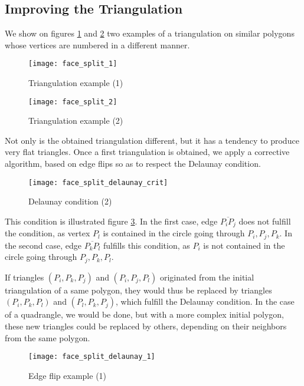 \subsection{Improving the Triangulation\label{sec:triangle_delaunay}}

We show on figures \ref{fig:algo.decoup_ex_1} and \ref{fig:algo.decoup_ex_2}
two examples of a triangulation on similar polygons whose vertices are
numbered in a different manner.

\begin{figure}[!h]
\centerline{
\texttt{[image: face\_split\_1]}}
\caption{Triangulation example (1)}
\label{fig:algo.decoup_ex_1}
\end{figure}

\begin{figure}[!h]
\centerline{
\texttt{[image: face\_split\_2]}}
\caption{Triangulation example (2)}
\label{fig:algo.decoup_ex_2}
\end{figure}

\vfill

Not only is the obtained triangulation different, but it has a tendency
to produce very flat triangles. Once a first triangulation is obtained,
we apply a corrective algorithm, based on edge flips so as to respect
the Delaunay condition.

\begin{figure}[!h]
\centerline{
\texttt{[image: face\_split\_delaunay\_crit]}}
\caption{Delaunay condition (2)}
\label{fig:algo.delaunay_cond}
\end{figure}

This condition is illustrated figure \ref{fig:algo.delaunay_cond}.
In the first case, edge $\overline{P_i P_j}$ does not fulfill the
condition, as vertex $P_l$ is contained in the circle going through
$P_i, P_j, P_k$. In the second case, edge $\overline{P_k P_l}$ fulfills
this condition, as $P_i$ is not contained in the circle going through
$P_j, P_k, P_l$.

If triangles $(P_i, P_k, P_j)$ and $(P_i, P_j, P_l)$ originated from
the initial triangulation of a same polygon, they would thus be replaced
by triangles $(P_i, P_k, P_l)$ and $(P_l, P_k, P_j)$, which
fulfill the Delaunay condition. In the case of a quadrangle, we
would be done, but with a more complex initial polygon,
these new triangles could be replaced by others, depending on their
neighbors from the same polygon.

\begin{figure}[!h]
\centerline{
\texttt{[image: face\_split\_delaunay\_1]}}
\caption{Edge flip example (1)}
\label{fig:algo.delaunay_ex_1}
\end{figure}

